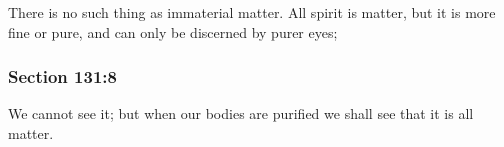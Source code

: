 		There is no such thing as immaterial matter.  All spirit is matter, but it is more fine or pure, and can only be discerned by purer eyes;


	\subsubsection{Section 131:8} %
		\label{DC131-8}

		We cannot see it; but when our bodies are purified we shall see that it is all matter.

